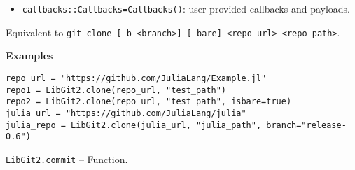 \begin{adjustwidth}{2em}{0pt}
\begin{itemize}
\item \texttt{callbacks::Callbacks=Callbacks()}: user provided callbacks and payloads.

\end{itemize}
Equivalent to \texttt{git clone [-b <branch>] [--bare] <repo\_url> <repo\_path>}.

\textbf{Examples}


\begin{verbatim}
repo_url = "https://github.com/JuliaLang/Example.jl"
repo1 = LibGit2.clone(repo_url, "test_path")
repo2 = LibGit2.clone(repo_url, "test_path", isbare=true)
julia_url = "https://github.com/JuliaLang/julia"
julia_repo = LibGit2.clone(julia_url, "julia_path", branch="release-0.6")
\end{verbatim}



\end{adjustwidth}
\hypertarget{9554164652611238018}{} 
\hyperlink{9554164652611238018}{\texttt{LibGit2.commit}}  -- {Function.}

